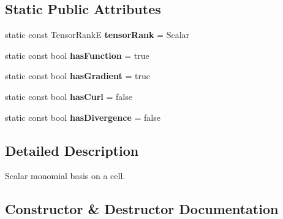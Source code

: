 \subsection*{Static Public Attributes}
\begin{DoxyCompactItemize}
\item 
\mbox{\label{classHArDCore3D_1_1MonomialScalarBasisCell_a104e27d408ed50f11be94319e1f25257}} 
static const Tensor\+RankE {\bfseries tensor\+Rank} = Scalar
\item 
\mbox{\label{classHArDCore3D_1_1MonomialScalarBasisCell_aca469ec6c0769d354043cac5c0e46efa}} 
static const bool {\bfseries has\+Function} = true
\item 
\mbox{\label{classHArDCore3D_1_1MonomialScalarBasisCell_aaaa24785ad98f4e6c85aaa2d84b0062c}} 
static const bool {\bfseries has\+Gradient} = true
\item 
\mbox{\label{classHArDCore3D_1_1MonomialScalarBasisCell_a4ae626adeaf1b1d8c414afe1bbe85bde}} 
static const bool {\bfseries has\+Curl} = false
\item 
\mbox{\label{classHArDCore3D_1_1MonomialScalarBasisCell_a3209c64ffde8ca1f8d63abb33ce8ee5a}} 
static const bool {\bfseries has\+Divergence} = false
\end{DoxyCompactItemize}


\subsection{Detailed Description}
Scalar monomial basis on a cell. 

\subsection{Constructor \& Destructor Documentation}
\mbox{\label{classHArDCore3D_1_1MonomialScalarBasisCell_a88e7776e18ccc8e6dff40f2c0644246a}} 
